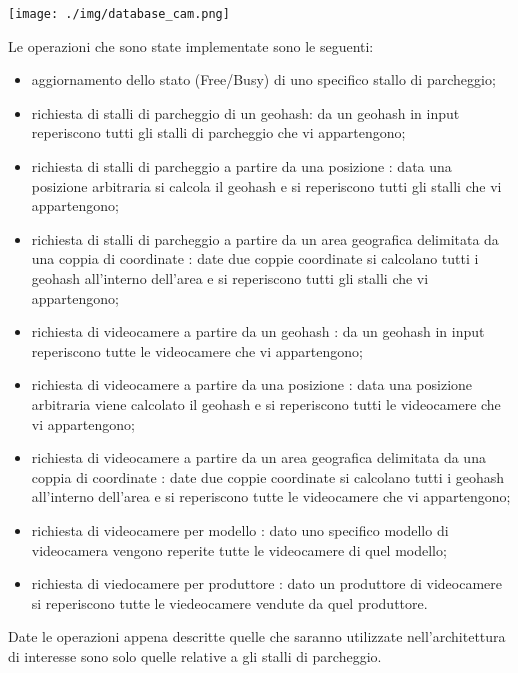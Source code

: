 \vspace{1.6truecm}

\centerline{\texttt{[image: ./img/database\_cam.png]}}

\vspace{1.2truecm}

Le operazioni che sono state implementate sono le seguenti:


\begin{itemize}
	\item aggiornamento dello stato (Free/Busy) di uno specifico stallo di parcheggio;
	\item richiesta di stalli di parcheggio di un geohash: da un geohash in input reperiscono tutti gli stalli di parcheggio che vi appartengono;
	\item richiesta di stalli di parcheggio a partire da una posizione : data una posizione arbitraria si calcola il geohash e si reperiscono tutti gli stalli che vi appartengono;
	\item richiesta di stalli di parcheggio a partire da un area geografica delimitata da una coppia di coordinate : date due coppie coordinate si calcolano tutti i geohash all'interno dell'area e si reperiscono tutti gli stalli che vi appartengono;
	\item richiesta di videocamere a partire da un geohash : da un geohash in input reperiscono tutte le videocamere che vi appartengono;
	\item richiesta di videocamere a partire da una posizione : data una posizione arbitraria viene calcolato il geohash e si reperiscono tutti le videocamere che vi appartengono;
	\item richiesta di videocamere a partire da un area geografica delimitata da una coppia di coordinate : date due coppie coordinate si calcolano tutti i geohash all'interno dell'area e si reperiscono tutte le videocamere che vi appartengono;
	\item richiesta di videocamere per modello : dato uno specifico modello di videocamera vengono reperite tutte le videocamere di quel modello;
	\item richiesta di viedocamere per produttore : dato un produttore di videocamere si reperiscono tutte le viedeocamere vendute da quel produttore.
\end{itemize}

Date le operazioni appena descritte quelle che saranno utilizzate nell'architettura di interesse sono solo quelle relative a gli stalli di parcheggio.
\vspace{0.5truecm}


